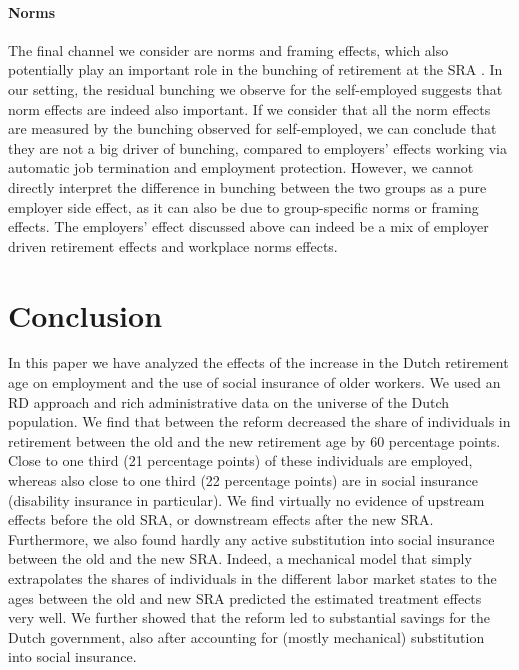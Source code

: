 \documentclass[12pt,a4paper]{article}
\begin{document}
\paragraph{Norms} The final channel we consider are norms and framing effects, which also potentially play an important role in the bunching of retirement at the SRA \citep{behaghel_framing_2012, lalive2019raising, seibold2019reference}. In our setting, the residual bunching we observe for the self-employed suggests that norm effects are indeed also important. If we consider that all the norm effects are measured by the bunching observed for self-employed, we can conclude that they are not a big driver of bunching, compared to employers' effects working via automatic job termination and employment protection. However, we cannot directly interpret the difference in bunching between the two groups as a pure employer side effect, as it can also be due to group-specific norms or framing effects. The employers' effect discussed above can indeed be a mix of employer driven retirement effects and workplace norms effects.

\section{Conclusion} 

In this paper we have analyzed the effects of the increase in the Dutch retirement age on employment and the use of social insurance of older workers. We used an RD approach and rich administrative data on the universe of the Dutch population. We find that between the reform decreased the share of individuals in retirement between the old and the new retirement age by 60 percentage points. Close to one third (21 percentage points) of these individuals are employed, whereas also close to one third (22 percentage points) are in social insurance (disability insurance in particular). We find virtually no evidence of upstream effects before the old SRA, or downstream effects after the new SRA. Furthermore, we also found hardly any active substitution into social insurance between the old and the new SRA. Indeed, a mechanical model that simply extrapolates the shares of individuals in the different labor market states to the ages between the old and new SRA predicted the estimated treatment effects very well. %
We further showed that the reform led to substantial savings for the Dutch government, also after accounting for (mostly mechanical) substitution into social insurance.
\end{document}
